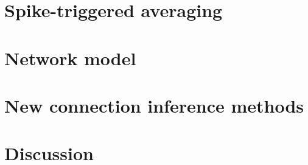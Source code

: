 \documentclass[a4paper, oneside, 11pt]{memoir}
\begin{document}




\chapter{Spike-triggered averaging}
\label{ch3-STA}




\chapter{Network model}
\label{ch4-network}




\chapter{New connection inference methods}
\label{ch5-new-methods}




\chapter{Discussion}
\label{ch6}




\References
\end{document}

